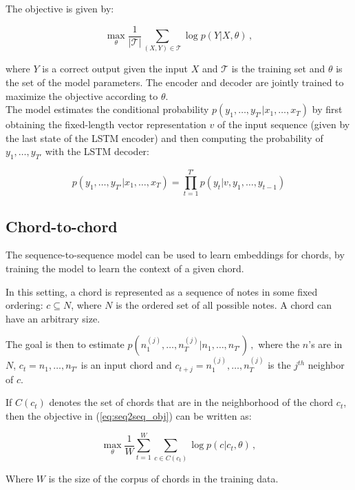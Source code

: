 \documentclass[12pt]{article}\pagestyle{myheadings}
\newcommand{\T}{\mathcal{T}}
\begin{document}
The objective is given by:

\begin{equation}
\max_{\theta} \frac{1}{|\T|} \sum_{(X,Y) \in \T} \log p(Y|X,\theta) \,,
\label{eq:seq2seq_obj}
\end{equation}

where $Y$ is a correct output given the input $X$ and $\T$ is the training set and $\theta$ is the set of the model parameters. 
The encoder and decoder are jointly trained to maximize the objective according to $\theta$.
\\

The model estimates the conditional probability $p(y_1,\ldots,y_{T'} | x_1, \ldots, x_T)$ by first obtaining the fixed-length vector representation $v$ of the input sequence (given by the last state of the LSTM encoder) and then computing the probability of $y_1,\ldots,y_{T'} $ with the LSTM decoder: 

\begin{equation}
p(y_1,\ldots,y_{T'} | x_1, \ldots, x_T) = \prod_{t=1}^{T'} p(y_t|v, y_1,\ldots,y_{t-1})
\end{equation}

\subsection{Chord-to-chord}
The sequence-to-sequence model can be used to learn embeddings for chords, by training the model to learn the context of a given chord. 

In this setting, a chord is represented as a sequence of notes in some fixed ordering: $c \subseteq N$, where $N$ is the ordered set of all possible notes. A chord can have an arbitrary size. 

The goal is then to estimate
$
p(n^{(j)}_1, \ldots, n^{(j)}_T | n_1,\ldots,n_{T'})\,,
$
where the $n$'s are in $N$, $ c_t=n_1,\ldots,n_{T'}$ is an input chord and $c_{t+j} =n^{(j)}_1, \ldots, n^{(j)}_T$ is the $j^{th}$ neighbor of $c$.

If $C(c_t)$ denotes the set of chords that are in the neighborhood of the chord $c_t$, then the objective in (\ref{eq:seq2seq_obj}) can be written as:

\begin{equation}
\max_{\theta}  \frac{1}{W} \sum_{t=1}^{W} \sum_{c\in C(c_t)} \log p(c|c_t,\theta)\,,
\label{eq:objective}
\end{equation}

Where $W$ is the size of the corpus of chords in the training data. 
\end{document}
